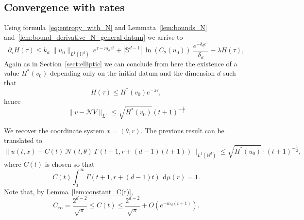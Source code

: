 \documentclass[12pt,longbibliography]{article}
\def\d{\,\mathrm{d}}
\def\d{\,\mathrm{d}}
\def\H{\mathbb{H}}
\theoremstyle{definition}
\theoremstyle{remark}
\theoremstyle{example}
\begin{document}
\subsection{Convergence with rates}\label{sect:convergence_with_rates}

Using formula~\eqref{eq:entropy_with_N} and Lemmata~\ref{lem:bounds_N} and~\ref{lem:bound_derivative_N_general datum} we arrive to
\[
\partial_\tau H(\tau) \leq  k_d\ \|u_0\|_{L^1(\H^d)}\ e^{\tau-m_d e^\tau}+ |\mathbb{S}^{d-1}|\ \ln(C_2(u_0))\ \frac{e^{-\delta_d e^{\tau}}}{\delta_d}  - \lambda H(\tau),
\]
Again as in Section~\ref{sect:elliptic} we can conclude from here the existence of a value $H^*(v_0)$ depending only on the initial datum and the dimension $d$ such that
\[
H(\tau)\leq H^*(v_0)e^{-\lambda \tau},
\]
hence
\[
\|v- \mathcal{N}V\|_{L^1}\leq \sqrt{H^*(v_0)}(t+1)^{-\frac{\lambda}{2}}
\]

We recover the coordinate system $x=(\theta, r)$. The previous result can be translated to
\begin{equation}\label{eq:convergence_N(t)}
	\| u(t,x) - C(t)\ \mathcal{N}(t,\theta)\ \Gamma(t+1, r+(d-1)(t+1)) \|_{L^1(\mathbb{H}^d)}  \leq \sqrt{H^*(u_0)}\cdot (t+1)^{-\frac{1}{2}},
\end{equation}
where $C(t)$ is chosen so that
\[
C(t)\int_0^\infty \Gamma(t+1, r+(d-1)t) \ \d \mu(r)= 1.
\]
Note that, by Lemma~\ref{lem:constant_C(t)},
\[
C_\infty = \frac{2^{d-2}}{\sqrt{\pi}}\leq C(t)\leq \frac{2^{d-2}}{\sqrt{\pi}} + O(e^{-m_d(t+1)}).
\]
\end{document}
